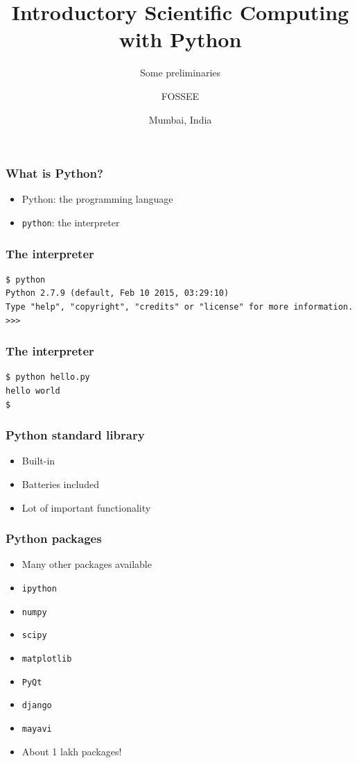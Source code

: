 \documentclass[14pt,compress]{beamer}
\title[Introduction]{Introductory Scientific Computing with
Python}
\subtitle{Some preliminaries}
\author[FOSSEE] {FOSSEE}
\institute[IIT Bombay] {Department of Aerospace Engineering\\IIT Bombay}
\date[] {Mumbai, India
}
\newcommand{\typ}[1]{\lstinline{#1}}
\begin{document}
\begin{frame}
  \maketitle
\end{frame}

\begin{frame}[plain]
  \frametitle{What is Python?}
  \large
  \begin{itemize}
  \item Python: the programming language

    \vspace*{0.5in}
  \item \typ{python}: the interpreter
  \end{itemize}
\end{frame}

\begin{frame}[fragile]
  \frametitle{The interpreter}
  \small
  \begin{lstlisting}
$ python
Python 2.7.9 (default, Feb 10 2015, 03:29:10)
Type "help", "copyright", "credits" or "license" for more information.
>>>
\end{lstlisting} %
\end{frame}

\begin{frame}[fragile]
  \frametitle{The interpreter}
  \small
\begin{lstlisting}
$ python hello.py
hello world
$
\end{lstlisting}
\end{frame}

\begin{frame}[plain]
  \frametitle{Python standard library}
  \begin{itemize}
  \item Built-in
  \item Batteries included
  \item Lot of important functionality
  \end{itemize}
\end{frame}

\begin{frame}[plain]
  \frametitle{Python packages}
  \begin{itemize}
  \item Many other packages available
  \item \typ{ipython}
  \item \typ{numpy}
  \item \typ{scipy}
  \item \typ{matplotlib}
  \item \typ{PyQt}
  \item \typ{django}
  \item \typ{mayavi}
  \item About 1 lakh packages!
  \end{itemize}
\end{frame}
\end{document}
